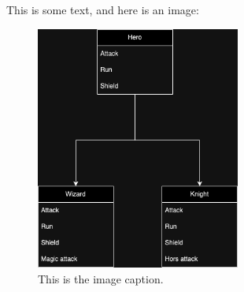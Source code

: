 \documentclass{article}
\begin{document}
    This is some text, and here is an image:

    \begin{figure}[h]
        \centering
        \includegraphics[width=0.6\textwidth]{test.png}
        \caption{This is the image caption.}
        \label{fig:my_image}
    \end{figure}
\end{document}
